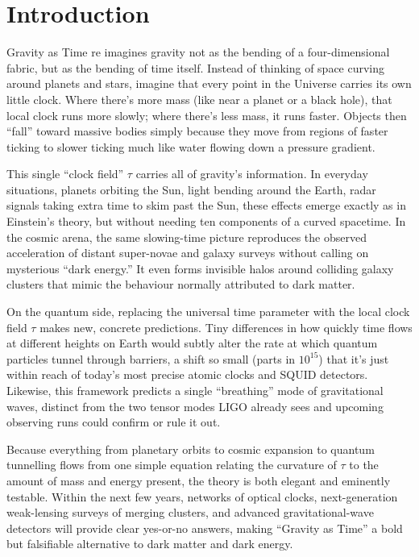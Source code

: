 \chapter*{Introduction}

Gravity as Time re imagines gravity not as the bending of a four-dimensional fabric, but as the bending of time itself. 
Instead of thinking of space curving around planets and stars, imagine that every point in the Universe carries its own 
little clock. Where there's more mass (like near a planet or a black hole), that local clock runs more slowly; where there's
less mass, it runs faster. Objects then “fall” toward massive bodies simply because they move from 
regions of faster ticking to slower ticking much like water flowing down a pressure gradient.

This single “clock field” $\tau$ carries all of gravity's information. In everyday situations, planets 
orbiting the Sun, light bending around the Earth, radar signals taking extra time to skim past the 
Sun, these effects emerge exactly as in Einstein's theory, but without needing ten components of a curved spacetime. 
In the cosmic arena, the same slowing-time picture reproduces the observed acceleration of distant super-novae 
and galaxy surveys without calling on mysterious “dark energy.” It even forms invisible halos around colliding 
galaxy clusters that mimic the behaviour normally attributed to dark matter.

On the quantum side, replacing the universal time parameter with the local clock field $\tau$ makes new, concrete predictions. 
Tiny differences in how quickly time flows at different heights on Earth would subtly alter the rate at which quantum 
particles tunnel through barriers, a shift so small (parts in $10^{15}$) that it's just within reach of today's most precise 
atomic clocks and SQUID detectors. Likewise, this framework predicts a single “breathing” mode of gravitational 
waves, distinct from the two tensor modes LIGO already sees and upcoming observing runs could confirm or rule it out.
 
Because everything from planetary orbits to cosmic expansion to quantum tunnelling flows 
from one simple equation relating the curvature of $\tau$ to the amount of mass and energy present,
the theory is both elegant and eminently testable. Within the next few years, networks of optical 
clocks, next-generation weak-lensing surveys of merging clusters, and advanced gravitational-wave detectors 
will provide clear yes-or-no answers, making “Gravity as Time” a bold but falsifiable alternative to dark matter and dark energy.

